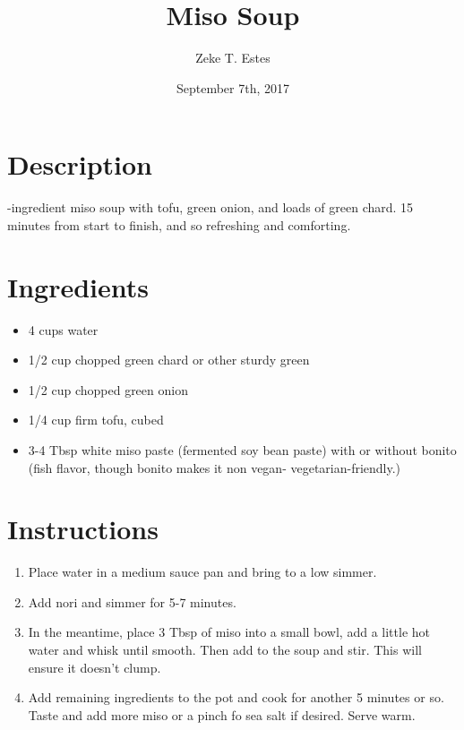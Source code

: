 \documentclass{article}
\title{Miso Soup}
\author{Zeke T. Estes}
\date{September 7th, 2017}
\begin{document}
\maketitle

\section*{Description}
-ingredient miso soup with tofu, green onion, and loads of green chard. 15 minutes from start to finish, and so refreshing and comforting.

\section*{Ingredients}
\begin{itemize}
    \item 4 cups water
    \item 1/2 cup chopped green chard or other sturdy green
    \item 1/2 cup chopped green onion
    \item 1/4 cup firm tofu, cubed
    \item 3-4 Tbsp white miso paste (fermented soy bean paste) with or without bonito (fish flavor, though bonito makes it non vegan- vegetarian-friendly.)

\end{itemize}

\section*{Instructions}
\begin{enumerate}
    \item Place water in a medium sauce pan and bring to a low simmer.
    \item Add nori and simmer for 5-7 minutes.
    \item In the meantime, place 3 Tbsp of miso into a small bowl, add a little hot water and whisk until smooth. Then add to the soup and stir. This will ensure it doesn't clump.
    \item Add remaining ingredients to the pot and cook for another 5 minutes or so. Taste and add more miso or a pinch fo sea salt if desired. Serve warm.
\end{enumerate}
\end{document}
